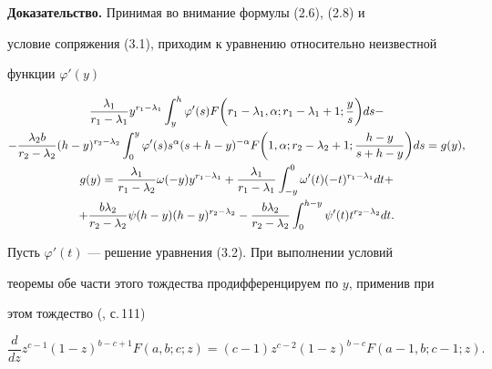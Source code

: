  


{\bf Доказательство.} Принимая во внимание формулы (2.6), (2.8) и 


условие сопряжения (3.1), приходим к уравнению относительно неизвестной 


функции $\varphi'(y)$ 


\begin{gather} 


\frac{\lambda_1}{r_1-\lambda_1}y^{r_1-\lambda_1}\int^h_y 


\varphi'(s)F\bigg(r_1-\lambda_1,\alpha;r_1-\lambda_1+1; 


\frac{y}{s}\bigg)d s- \notag \\ 


% 


-\frac{\lambda_2b}{r_2-\lambda_2}(h-y)^{r_2-\lambda_2}\int^y_0 


\varphi'(s)s^\alpha(s+h-y)^{-\alpha}F\bigg(1,\alpha;r_2-\lambda_2+1; 


\frac{h-y}{s+h-y}\bigg)d s=g(y), \\ 


% 


g(y)=\frac{\lambda_1}{r_1-\lambda_2}\omega(-y)y^{r_1-\lambda_1} 


+\frac{\lambda_1}{r_1-\lambda_1}\int^0_{-y}\omega'(t) 


(-t)^{r_1-\lambda_1}d t+ \notag \\


+\frac{b\lambda_2}{r_2-\lambda_2} 


\psi(h-y)(h-y)^{r_2-\lambda_2}-\frac{b\lambda_2}{r_2-\lambda_2} 


\int^{h-y}_0 \psi'(t)t^{r_2-\lambda_2}d t.\notag 


\end{gather} 


 


Пусть $\varphi'(t)$ --- решение уравнения (3.2). При выполнении условий 


теоремы обе части этого тождества продифференцируем по $y$, применив при 


этом тождество (\cite{2}, с.\,111) 


$$ 


\frac{d}{d z}z^{c-1}(1-z)^{b-c+1}F(a,b;c;z)=(c-1)z^{c-2} 


(1-z)^{b-c}F(a-1,b;c-1;z). 


$$ 


 


